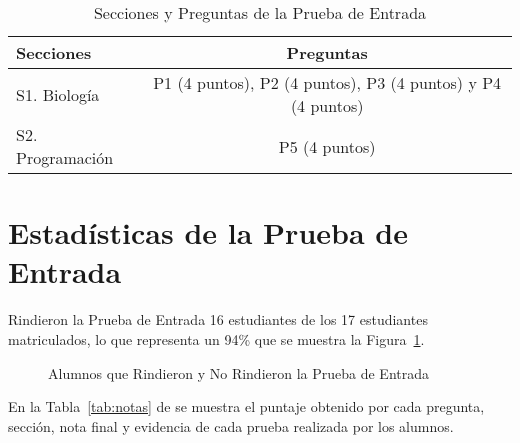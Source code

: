 \documentclass[11pt,fleqn]{book} %
\begin{document}
\begin{table}[h]
\centering
\begin{tabular}{l|c}
\hline
\textbf{Secciones} & 
\textbf{Preguntas} 
\\ \hline
S1. Biología &
P1 (4 puntos), P2 (4 puntos), P3 (4 puntos) y P4 (4 puntos)
\\ \hline
S2. Programación &
P5 (4 puntos)
\\ \hline
\end{tabular}
\caption{Secciones y Preguntas de la Prueba de Entrada}
\label{tab:seccpruebaentrada}
\end{table}

\section{Estadísticas de la Prueba de Entrada}
Rindieron la Prueba de Entrada 16 estudiantes de los 17 estudiantes matriculados, lo que representa un 94\% que se muestra la Figura~\ref{fig:prueba_entrada}.

\begin{figure}[h]
\centering
{}
\caption{Alumnos que Rindieron y No Rindieron la Prueba de Entrada}
\label{fig:prueba_entrada}
\end{figure}

En la Tabla~\ref{tab:notas} de se muestra el puntaje obtenido por cada pregunta, sección, nota final y evidencia de cada prueba realizada por los alumnos.

\newpage
\end{document}
